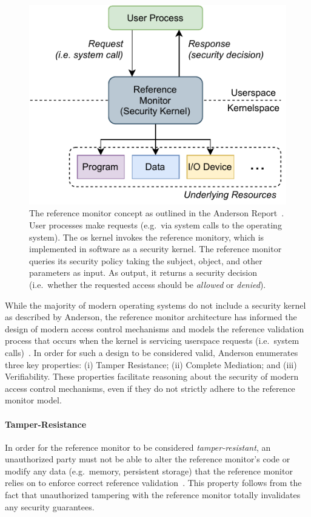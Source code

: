 \begin{figure}[tbp]
  \centering
  \includegraphics[width=0.6\linewidth]{figs/background/refmon.pdf}
  \caption[The reference monitor concept]{
    The reference monitor concept as outlined in the Anderson
    Report~\cite{anderson1972_report}. User processes make requests (e.g.~via system calls
    to the operating system). The \gls{os} kernel invokes the reference monitory, which is
    implemented in software as a security kernel. The reference monitor queries its
    security policy taking the subject, object, and other parameters as input. As output,
    it returns a security decision (i.e.~whether the requested access should be
    \textit{allowed} or \textit{denied}).
  }%
  \label{fig:refmon}
\end{figure}

While the majority of modern operating systems do not include a security kernel as
described by Anderson, the reference monitor architecture has informed the design of
modern access control mechanisms and models the reference validation process that occurs
when the kernel is servicing userspace requests (i.e.~system
calls)~\cite{van_oorschot2020_tools_jewels}. In order for such a design to be considered
valid, Anderson enumerates three key properties: (i) Tamper Resistance; (ii) Complete
Mediation; and (iii) Verifiability. These properties facilitate reasoning about the
security of modern access control mechanisms, even if they do not strictly adhere to the
reference monitor model.

\paragraph*{Tamper-Resistance}

In order for the reference monitor to be considered \textit{tamper-resistant}, an unauthorized
party must not be able to alter the reference monitor's code or modify any data
(e.g.~memory, persistent storage) that the reference monitor relies on to enforce correct
reference validation~\cite{anderson1972_report}. This property follows from the fact that
unauthorized tampering with the reference monitor totally invalidates any security
guarantees.

